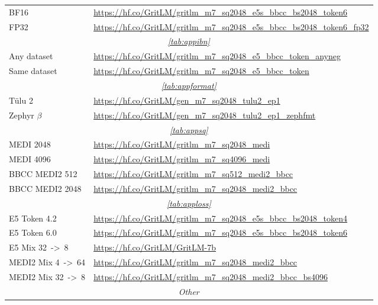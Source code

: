 \documentclass{article}
\newcommand{\tulu}{T\"ulu}
\begin{document}
\begin{longtable}{p{2.9cm} p{10.2cm}}
\midrule
BF16 & \url{https://hf.co/GritLM/gritlm_m7_sq2048_e5s_bbcc_bs2048_token6} \\
FP32 & \url{https://hf.co/GritLM/gritlm_m7_sq2048_e5s_bbcc_bs2048_token6_fp32} \\
\midrule
\multicolumn{2}{c}{\textit{\autoref{tab:appibn}}} \\
\midrule
Any dataset & \url{https://hf.co/GritLM/gritlm_m7_sq2048_e5_bbcc_token_anyneg} \\
Same dataset & \url{https://hf.co/GritLM/gritlm_m7_sq2048_e5_bbcc_token} \\
\midrule
\multicolumn{2}{c}{\textit{\autoref{tab:appformat}}} \\
\midrule
\tulu{} 2 & \url{https://hf.co/GritLM/gen_m7_sq2048_tulu2_ep1} \\
Zephyr $\beta$ & \url{https://hf.co/GritLM/gen_m7_sq2048_tulu2_ep1_zephfmt} \\
\midrule
\multicolumn{2}{c}{\textit{\autoref{tab:appsq}}} \\
\midrule
MEDI 2048 & \url{https://hf.co/GritLM/gritlm_m7_sq2048_medi} \\
MEDI 4096 & \url{https://hf.co/GritLM/gritlm_m7_sq4096_medi} \\
BBCC MEDI2 512 & \url{https://hf.co/GritLM/gritlm_m7_sq512_medi2_bbcc} \\
BBCC MEDI2 2048 & \url{https://hf.co/GritLM/gritlm_m7_sq2048_medi2_bbcc} \\
\midrule
\multicolumn{2}{c}{\textit{\autoref{tab:apploss}}} \\
\midrule
E5 Token 4.2 & \url{https://hf.co/GritLM/gritlm_m7_sq2048_e5s_bbcc_bs2048_token4} \\
E5 Token 6.0 & \url{https://hf.co/GritLM/gritlm_m7_sq2048_e5s_bbcc_bs2048_token6} \\
E5 Mix 32~->~8 & \url{https://hf.co/GritLM/GritLM-7b} \\
MEDI2 Mix 4~->~64 & \url{https://hf.co/GritLM/gritlm_m7_sq2048_medi2_bbcc} \\
MEDI2 Mix 32~->~8 & \url{https://hf.co/GritLM/gritlm_m7_sq2048_medi2_bbcc_bs4096} \\
\midrule
\multicolumn{2}{c}{\textit{Other}} \\

\end{longtable}
\end{document}
